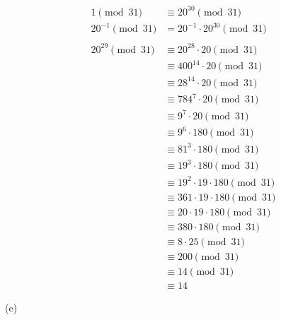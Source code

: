 \begin{solution}
\begin{align*}
1 \pmod {31} &\equiv 20^{30} \pmod{31} \\ 
20^{-1} \pmod{31} &= 20^{-1} \cdot 20^{30} \pmod{31} \\
\\
20^{29} \pmod{31} &\equiv 20^{28} \cdot 20 \pmod{31} \\
&\equiv 400^{14} \cdot 20 \pmod{31} \\
&\equiv 28^{14} \cdot 20 \pmod{31} \\
&\equiv 784^{7} \cdot 20 \pmod{31} \\
&\equiv 9^{7} \cdot 20 \pmod{31} \\
&\equiv 9^{6} \cdot 180 \pmod{31} \\
&\equiv 81^{3} \cdot 180 \pmod{31} \\
&\equiv 19^{3} \cdot 180 \pmod{31} \\
&\equiv 19^{2} \cdot 19 \cdot 180 \pmod{31} \\
&\equiv 361 \cdot 19 \cdot 180 \pmod{31} \\
&\equiv 20 \cdot 19 \cdot 180 \pmod{31} \\
&\equiv 380 \cdot 180 \pmod{31} \\
&\equiv 8 \cdot 25 \pmod{31} \\
&\equiv 200 \pmod{31} \\
&\equiv 14 \pmod{31} \\
&\equiv 14
\end{align*}

(e)


\end{solution}
